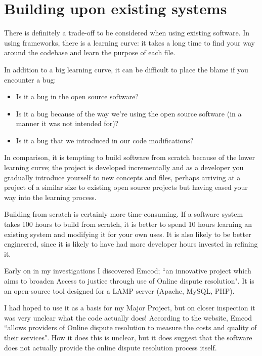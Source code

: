 \chapter{Building upon existing systems}\label{appendix:buildingUponExistingSystems}

There is definitely a trade-off to be considered when using existing software. In using frameworks, there is a learning curve: it takes a long time to find your way around the codebase and learn the purpose of each file.

In addition to a big learning curve, it can be difficult to place the blame if you encounter a bug:

\begin{itemize}
\item Is it a bug in the open source software?
\item Is it a bug because of the way we're using the open source software (in a manner it was not intended for)?
\item Is it a bug that we introduced in our code modifications?
\end{itemize}

In comparison, it is tempting to build software from scratch because of the lower learning curve; the project is developed incrementally and as a developer you gradually introduce yourself to new concepts and files, perhaps arriving at a project of a similar size to existing open source projects but having eased your way into the learning process.

Building from scratch is certainly more time-consuming. If a software system takes 100 hours to build from scratch, it is better to spend 10 hours learning an existing system and modifying it for your own uses. It is also likely to be better engineered, since it is likely to have had more developer hours invested in refining it.

Early on in my investigations I discovered Emcod; ``an innovative project which aims to broaden Access to justice through use of Online dispute resolution". It is an open-source tool designed for a LAMP server (Apache, MySQL, PHP).

I had hoped to use it as a basis for my Major Project, but on closer inspection it was very unclear what the code actually does! According to the website, Emcod ``allows providers of Online dispute resolution to measure the costs and quality of their services". How it does this is unclear, but it does suggest that the software does not actually provide the online dispute resolution process itself.

